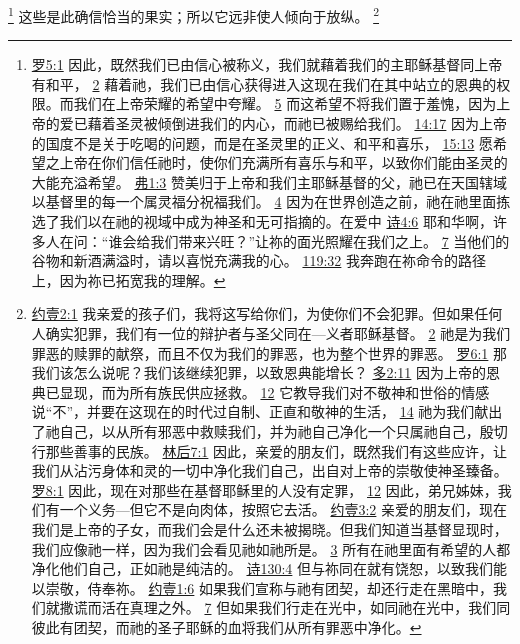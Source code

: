 \documentclass[12pt, a4paper, oneside]{ctexart}
\begin{document}
	\footnote {
		\href{https://biblehub.com/romans/5-1.htm}{罗5:1} 因此，既然我们已由信心被称义，我们就藉着我们的主耶稣基督同上帝有和平，
		\href{https://biblehub.com/romans/5-2.htm}{2} 藉着祂，我们已由信心获得进入这现在我们在其中站立的恩典的权限。而我们在上帝荣耀的希望中夸耀。
		\href{https://biblehub.com/romans/5-5.htm}{5} 而这希望不将我们置于羞愧，因为上帝的爱已藉着圣灵被倾倒进我们的内心，而祂已被赐给我们。
		\href{https://biblehub.com/romans/14-17.htm}{14:17} 因为上帝的国度不是关于吃喝的问题，而是在圣灵里的正义、和平和喜乐，
		\href{https://biblehub.com/romans/15-13.htm}{15:13} 愿希望之上帝在你们信任祂时，使你们充满所有喜乐与和平，以致你们能由圣灵的大能充溢希望。
		\href{https://biblehub.com/ephesians/1-3.htm}{弗1:3} 赞美归于上帝和我们主耶稣基督的父，祂已在天国辖域以基督里的每一个属灵福分祝福我们。
		\href{https://biblehub.com/ephesians/1-4.htm}{4} 因为在世界创造之前，祂在祂里面拣选了我们以在祂的视域中成为神圣和无可指摘的。在爱中
		\href{https://biblehub.com/psalms/4-6.htm}{诗4:6} 耶和华啊，许多人在问：“谁会给我们带来兴旺？”让祢的面光照耀在我们之上。
		\href{https://biblehub.com/psalms/4-7.htm}{7} 当他们的谷物和新酒满溢时，请以喜悦充满我的心。
		\href{https://biblehub.com/psalms/119-32.htm}{119:32} 我奔跑在祢命令的路径上，因为祢已拓宽我的理解。
	}
	这些是此确信恰当的果实；所以它远非使人倾向于放纵。
	\footnote {
		\href{https://biblehub.com/1_john/2-1.htm}{约壹2:1} 我亲爱的孩子们，我将这写给你们，为使你们不会犯罪。但如果任何人确实犯罪，我们有一位的辩护者与圣父同在---义者耶稣基督。
		\href{https://biblehub.com/1_john/2-2.htm}{2} 祂是为我们罪恶的赎罪的献祭，而且不仅为我们的罪恶，也为整个世界的罪恶。
		\href{https://biblehub.com/romans/6-1.htm}{罗6:1} 那我们该怎么说呢？我们该继续犯罪，以致恩典能增长？
        \href{https://biblehub.com/titus/2-11.htm}{多2:11} 因为上帝的恩典已显现，而为所有族民供应拯救。
		\href{https://biblehub.com/titus/2-12.htm}{12} 它教导我们对不敬神和世俗的情感说“不”，并要在这现在的时代过自制、正直和敬神的生活，
		\href{https://biblehub.com/titus/2-14.htm}{14} 祂为我们献出了祂自己，以从所有邪恶中救赎我们，并为祂自己净化一个只属祂自己，殷切行那些善事的民族。
		\href{https://biblehub.com/2_corinthians/7-1.htm}{林后7:1} 因此，亲爱的朋友们，既然我们有这些应许，让我们从沾污身体和灵的一切中净化我们自己，出自对上帝的崇敬使神圣臻备。
		\href{https://biblehub.com/romans/8-1.htm}{罗8:1} 因此，现在对那些在基督耶稣里的人没有定罪，
		\href{https://biblehub.com/romans/8-12.htm}{12} 因此，弟兄姊妹，我们有一个义务---但它不是向肉体，按照它去活。
		\href{https://biblehub.com/1_john/3-2.htm}{约壹3:2} 亲爱的朋友们，现在我们是上帝的子女，而我们会是什么还未被揭晓。但我们知道当基督显现时，我们应像祂一样，因为我们会看见祂如祂所是。
		\href{https://biblehub.com/1_john/3-3.htm}{3} 所有在祂里面有希望的人都净化他们自己，正如祂是纯洁的。
		\href{https://biblehub.com/psalms/130-4.htm}{诗130:4} 但与祢同在就有饶恕，以致我们能以崇敬，侍奉祢。
        \href{https://biblehub.com/1_john/1-6.htm}{约壹1:6} 如果我们宣称与祂有团契，却还行走在黑暗中，我们就撒谎而活在真理之外。
		\href{https://biblehub.com/1_john/1-7.htm}{7} 但如果我们行走在光中，如同祂在光中，我们同彼此有团契，而祂的圣子耶稣的血将我们从所有罪恶中净化。
	}
\end{document}
